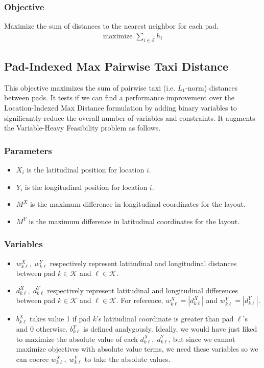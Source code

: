 \documentclass[10pt]{article}
\begin{document}
	\subsubsection{Objective}
	\noindent Maximize the sum of distances to the nearest neighbor for each pad.
	\begin{align}
		\text{maximize } \sum_{i \in \mathcal{S}} h_i
	\end{align}

	\subsection{Pad-Indexed Max Pairwise Taxi Distance}
	This objective maximizes the sum of pairwise taxi (i.e. $ L_1 $-norm) distances between pads. It tests if we can find a performance improvement over the Location-Indexed Max Distance formulation by adding binary variables to significantly reduce the overall number of variables and constraints. It augments the Variable-Heavy Feasibility problem as follows.
	
	\subsubsection{Parameters}
	\begin{itemize}
		\item $ X_i $ is the latitudinal position for location $ i $.
		\item $ Y_i $ is the longitudinal position for location $ i $.
		\item $ M^X $ is the maximum difference in longitudinal coordinates for the layout.
		\item $ M^Y $ is the maximum difference in latitudinal coordinates for the layout.
	\end{itemize}
	
	\subsubsection{Variables}
	\begin{itemize}
		\item $ w_{k\ell}^X, \; w_{k\ell}^Y $ respectively represent latitudinal and longitudinal distances between pad $ k \in \mathcal{K}$ and $ \ell \in \mathcal{K}$.
		\item $ d_{k\ell}^X, \; d_{k\ell}^Y $ respectively represent latitudinal and longitudinal differences between pad $ k \in \mathcal{K}$ and $ \ell \in \mathcal{K}$. For reference, $ w_{k\ell}^X = |d_{k\ell}^X| $ and $ w_{k\ell}^Y = |d_{k\ell}^Y| $.
		\item $ b_{k\ell}^X $ takes value 1 if pad $ k $'s latitudinal coordinate is greater than pad $ \ell $'s and 0 otherwise. $ b_{k\ell}^Y $ is defined analygously. Ideally, we would have just liked to maximize the absolute value of each $ d_{k\ell}^X, \; d_{k\ell}^Y $, but since we cannot maximize objectives with absolute value terms, we need these variables so we can coerce $ w_{k\ell}^X, \; w_{k\ell}^Y $ to take the absolute values.
	\end{itemize}
	
\end{document}
